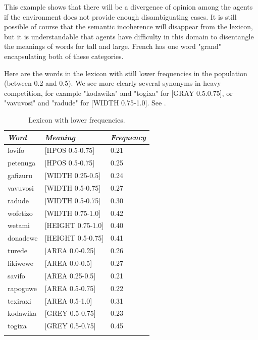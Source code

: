 This example shows that there will be a divergence of 
opinion among the agents if the environment does not 
provide enough 
disambiguating cases. It is still possible of course that 
the semantic incoherence will disappear from the lexicon, 
but it is understandable that agents have difficulty 
in this domain to disentangle the meanings of words for 
tall and large. French has one word "grand" encapsulating
both of these categories.

Here are the words in the lexicon with still lower 
frequencies in the population (between 0.2 and 0.5). We see
more clearly several synonyms in heavy competition, for example 
"kodawika" and "togixa" for [GRAY 0.5.0.75], or 
"vavuvosi" and "radude" for [WIDTH 0.75-1.0]. See . 
\begin{table}
\begin{center}
\begin{tabular}{ l  l  l }
\lsptoprule
{\it Word}&{\it Meaning} & {\it Frequency} \\ \midrule
lovifo & [HPOS 0.5-0.75] & 0.21 \\ \midrule
petenuga & [HPOS 0.5-0.75] & 0.25 \\ \midrule
gafizuru & [WIDTH 0.25-0.5] & 0.24 \\ \midrule
vavuvosi & [WIDTH 0.5-0.75] & 0.27 \\ \midrule
radude & [WIDTH 0.5-0.75] & 0.30 \\ \midrule
wofetizo & [WIDTH 0.75-1.0] & 0.42 \\ \midrule
wetami & [HEIGHT 0.75-1.0] & 0.40 \\ \midrule
donadewe & [HEIGHT 0.5-0.75] & 0.41 \\ \midrule
turede & [AREA 0.0-0.25] & 0.26 \\ \midrule
likiwewe & [AREA 0.0-0.5] & 0.27 \\ \midrule
savifo & [AREA 0.25-0.5] & 0.21 \\ \midrule
rapoguwe & [AREA 0.5-0.75] & 0.22 \\ \midrule
texiraxi & [AREA 0.5-1.0] & 0.31 \\ \midrule
kodawika & [GREY 0.5-0.75] & 0.23 \\ \midrule
togixa & [GREY 0.5-0.75] & 0.45 \\ \midrule
\lspbottomrule
\end{tabular}
\caption{\label{tab:comp} Lexicon with lower frequencies.}
\end{center}
\end{table}


